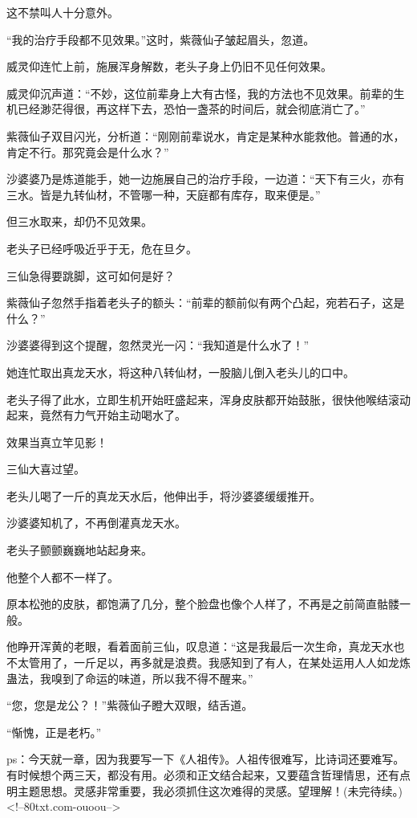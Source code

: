\begin{this_body}
这不禁叫人十分意外。

“我的治疗手段都不见效果。”这时，紫薇仙子皱起眉头，忽道。

威灵仰连忙上前，施展浑身解数，老头子身上仍旧不见任何效果。

威灵仰沉声道：“不妙，这位前辈身上大有古怪，我的方法也不见效果。前辈的生机已经渺茫得很，再这样下去，恐怕一盏茶的时间后，就会彻底消亡了。”

紫薇仙子双目闪光，分析道：“刚刚前辈说水，肯定是某种水能救他。普通的水，肯定不行。那究竟会是什么水？”

沙婆婆乃是炼道能手，她一边施展自己的治疗手段，一边道：“天下有三火，亦有三水。皆是九转仙材，不管哪一种，天庭都有库存，取来便是。”

但三水取来，却仍不见效果。

老头子已经呼吸近乎于无，危在旦夕。

三仙急得要跳脚，这可如何是好？

紫薇仙子忽然手指着老头子的额头：“前辈的额前似有两个凸起，宛若石子，这是什么？”

沙婆婆得到这个提醒，忽然灵光一闪：“我知道是什么水了！”

她连忙取出真龙天水，将这种八转仙材，一股脑儿倒入老头儿的口中。

老头子得了此水，立即生机开始旺盛起来，浑身皮肤都开始鼓胀，很快他喉结滚动起来，竟然有力气开始主动喝水了。

效果当真立竿见影！

三仙大喜过望。

老头儿喝了一斤的真龙天水后，他伸出手，将沙婆婆缓缓推开。

沙婆婆知机了，不再倒灌真龙天水。

老头子颤颤巍巍地站起身来。

他整个人都不一样了。

原本松弛的皮肤，都饱满了几分，整个脸盘也像个人样了，不再是之前简直骷髅一般。

他睁开浑黄的老眼，看着面前三仙，叹息道：“这是我最后一次生命，真龙天水也不太管用了，一斤足以，再多就是浪费。我感知到了有人，在某处运用人人如龙炼蛊法，我嗅到了命运的味道，所以我不得不醒来。”

“您，您是龙公？！”紫薇仙子瞪大双眼，结舌道。

“惭愧，正是老朽。”

ps：今天就一章，因为我要写一下《人祖传》。人祖传很难写，比诗词还要难写。有时候想个两三天，都没有用。必须和正文结合起来，又要蕴含哲理情思，还有点明主题思想。灵感非常重要，我必须抓住这次难得的灵感。望理解！(未完待续。)<!--80txt.com-ouoou-->

\end{this_body}

